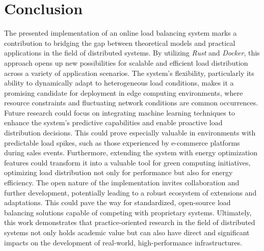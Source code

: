 \documentclass[twocolumn]{webofc}
\begin{document}
\section{Conclusion}
The presented implementation of an online load balancing system marks a contribution to bridging the gap between theoretical models and practical applications in the field of distributed systems. By utilizing \textit{Rust} and \textit{Docker}, this approach opens up new possibilities for scalable and efficient load distribution across a variety of application scenarios. The system's flexibility, particularly its ability to dynamically adapt to heterogeneous load conditions, makes it a promising candidate for deployment in edge computing environments, where resource constraints and fluctuating network conditions are common occurrences. Future research could focus on integrating machine learning techniques to enhance the system's predictive capabilities and enable proactive load distribution decisions. This could prove especially valuable in environments with predictable load spikes, such as those experienced by e-commerce platforms during sales events. Furthermore, extending the system with energy optimization features could transform it into a valuable tool for green computing initiatives, optimizing load distribution not only for performance but also for energy efficiency. The open nature of the implementation invites collaboration and further development, potentially leading to a robust ecosystem of extensions and adaptations. This could pave the way for standardized, open-source load balancing solutions capable of competing with proprietary systems. Ultimately, this work demonstrates that practice-oriented research in the field of distributed systems not only holds academic value but can also have direct and significant impacts on the development of real-world, high-performance infrastructures.


\end{document}
